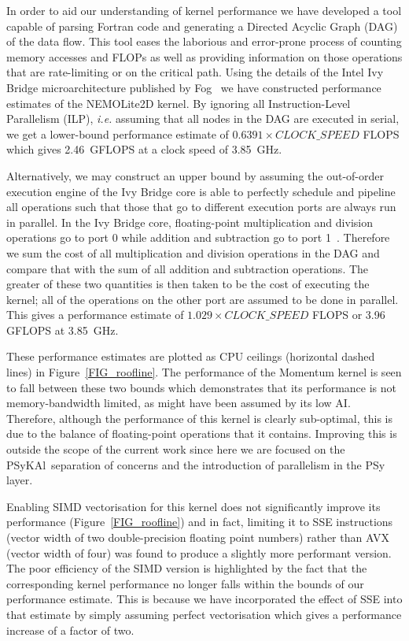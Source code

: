 \documentclass[journal]{IEEEtran}
\newcommand{\psykal}{{PS}y{KA}l}
\begin{document}
In order to aid our understanding of kernel performance we have
developed a tool capable of parsing Fortran code and generating a
Directed Acyclic Graph (DAG) of the data flow. This tool eases the
laborious and error-prone process of counting memory accesses and
FLOPs as well as providing information on those operations that are
rate-limiting or on the critical path. Using the details of the Intel
Ivy Bridge microarchitecture published by Fog~\cite{fog_microarch,
  fog_instructions} we have constructed performance estimates of the
NEMOLite2D kernel. By ignoring all Instruction-Level Parallelism
(ILP), \textit{i.e.} assuming that all nodes in the DAG are executed
in serial, we get a lower-bound performance estimate of $0.6391 \times
CLOCK\_SPEED$ FLOPS which gives 2.46~GFLOPS at a clock speed of
3.85~GHz.

Alternatively, we may construct an upper bound by assuming the
out-of-order execution engine of the Ivy Bridge core is able to
perfectly schedule and pipeline all operations such that those that go
to different execution ports are always run in parallel. In the Ivy
Bridge core, floating-point multiplication and division operations go
to port 0 while addition and subtraction go to port
1~\cite{fog_instructions}. Therefore we sum the cost of all
multiplication and division operations in the DAG and compare that
with the sum of all addition and subtraction operations. The greater
of these two quantities is then taken to be the cost of executing the
kernel; all of the operations on the other port are assumed to be done
in parallel. This gives a performance estimate of $1.029 \times
CLOCK\_SPEED$ FLOPS or 3.96 GFLOPS at 3.85~GHz.

These performance estimates are plotted as CPU ceilings (horizontal
dashed lines) in Figure~\ref{FIG_roofline}. The performance of the
Momentum kernel is seen to fall between these two bounds which
demonstrates that its performance is not memory-bandwidth limited, as
might have been assumed by its low AI. Therefore, although the
performance of this kernel is clearly sub-optimal, this is due to the
balance of floating-point operations that it contains. Improving this
is outside the scope of the current work since here we are focused on
the \psykal\ separation of concerns and the introduction of parallelism
in the PSy layer.

Enabling SIMD vectorisation for this kernel does not significantly
improve its performance (Figure~\ref{FIG_roofline}) and in fact,
limiting it to SSE instructions (vector width of two double-precision
floating point numbers) rather than AVX (vector width of four) was
found to produce a slightly more performant version. The poor
efficiency of the SIMD version is highlighted by the fact that the
corresponding kernel performance no longer falls within the bounds of
our performance estimate. This is because we have incorporated the
effect of SSE into that estimate by simply assuming perfect
vectorisation which gives a performance increase of a factor of two.
\end{document}
